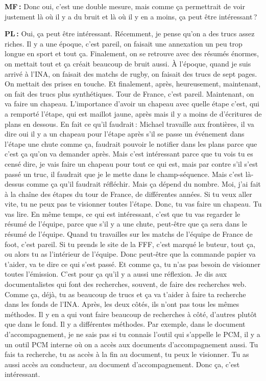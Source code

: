 \textbf{MF :} Donc oui, c'est une double mesure, mais comme ça permettrait de voir justement là où il y a du bruit et là où il y en a moins, ça peut être intéressant ? 

\textbf{PL :} Oui, ça peut être intéressant. Récemment, je pense qu'on a des trucs assez riches. Il y a une époque, c'est pareil, on faisait une annexation un peu trop longue en sport et tout ça.  Finalement, on se retrouve avec des résumés énormes, on mettait tout et ça créait beaucoup de bruit aussi. À l'époque, quand je suis arrivé à l’INA, on faisait des matchs de rugby, on faisait des trucs de sept pages. On mettait des prises en touche. Et finalement, après, heureusement, maintenant, on fait des trucs plus synthétiques. Tour de France, c'est pareil. Maintenant, on va faire un chapeau. L'importance d'avoir un chapeau avec quelle étape c'est, qui a remporté l'étape, qui est maillot jaune, après mais il y a moins de d’écritures de plans en dessous. En fait ce qu'il faudrait : Michael travaille aux frontières, il va dire oui il y a un chapeau pour l'étape après s'il se passe un événement dans l'étape une chute comme ça, faudrait pouvoir le notifier dans les plans parce que c'est ça qu'on va demander après. Mais c'est intéressant parce que tu vois tu es censé dire, je vais faire un chapeau pour tout ce qui est, mais par contre s'il s'est passé un truc, il faudrait que je le mette dans le champ-séquence.  Mais c'est là-dessus comme ça qu'il faudrait réfléchir. Mais ça dépend du nombre. Moi, j'ai fait à la chaîne des étapes du tour de France, de différentes années. Si tu veux aller vite, tu ne peux pas te visionner toutes l’étape.  Donc, tu vas faire un chapeau. Tu vas lire. En même temps, ce qui est intéressant, c'est que tu vas regarder le résumé de l'équipe, parce que s'il y a une chute, peut-être que ça sera dans le résumé de l'équipe. Quand tu travailles sur les matchs de l'équipe de France de foot, c'est pareil. Si tu prends le site de la FFF, c'est marqué le buteur, tout ça, ou alors tu as l’intérieur de l'équipe.  Donc peut-être que la commande papier va t'aider, va te dire ce qui s'est passé.  Et comme ça, tu n'as pas besoin de visionner toutes l’émission. C'est pour ça qu'il y a aussi une réflexion. Je dis aux documentalistes qui font des recherches, souvent, de faire des recherches web. Comme ça, déjà, tu as beaucoup de trucs et ça va t'aider à faire ta recherche dans les fonds de l’INA. Après, les deux côtés, ils n’ont pas tous les mêmes méthodes. Il y en a qui vont faire beaucoup de recherches à côté, d'autres plutôt que dans le fond.  Il y a différentes méthodes. Par exemple, dans le document d'accompagnement, je ne sais pas si tu connais l'outil qui s'appelle le PCM, il y a un outil PCM interne où on a accès aux documents d'accompagnement aussi. Tu fais ta recherche, tu as accès à la fin au document, tu peux le visionner. Tu as aussi accès au conducteur, au document d'accompagnement. Donc ça, c'est intéressant. 

